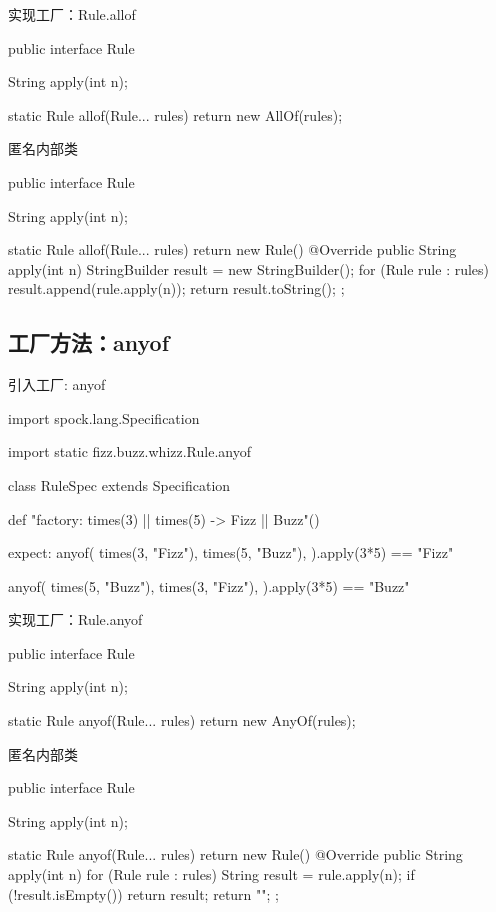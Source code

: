 \begin{frame}[fragile]{实现工厂：Rule.allof}
  \begin{java}
public interface Rule {
  String apply(int n);

  static Rule allof(Rule... rules) {
    return new AllOf(rules);
  }
}
  \end{java}
\end{frame}

\begin{frame}[fragile]{匿名内部类}
  \begin{java}
public interface Rule {
  String apply(int n);
  
  static Rule allof(Rule... rules) {
    return new Rule() {
      @Override
      public String apply(int n) {
        StringBuilder result = new StringBuilder();
        for (Rule rule : rules) {
          result.append(rule.apply(n));
        }
        return result.toString();
      }
    };
  }
}
  \end{java}
\end{frame}

\subsection{工厂方法：anyof}

\begin{frame}[fragile]{引入工厂: anyof}
  \begin{scala}
import spock.lang.Specification

import static fizz.buzz.whizz.Rule.anyof

class RuleSpec extends Specification {
  def "factory: times(3) || times(5) -> Fizz || Buzz"() {
    expect:
    anyof(
        times(3, "Fizz"),
        times(5, "Buzz"),
    ).apply(3*5) == "Fizz"
    
    anyof(
        times(5, "Buzz"),
        times(3, "Fizz"),
    ).apply(3*5) == "Buzz"    
  }
}
  \end{scala}
\end{frame}

\begin{frame}[fragile]{实现工厂：Rule.anyof}
  \begin{java}
public interface Rule {
  String apply(int n);

  static Rule anyof(Rule... rules) {
    return new AnyOf(rules);
  }
}
  \end{java}
\end{frame}

\begin{frame}[fragile]{匿名内部类}
  \begin{java}
public interface Rule {
  String apply(int n);
  
  static Rule anyof(Rule... rules) {
    return new Rule() {
      @Override
      public String apply(int n) {
        for (Rule rule : rules) {
          String result = rule.apply(n);
          if (!result.isEmpty())
            return result;
        }
        return "";
      }
    };
  }
}
  \end{java}
\end{frame}

